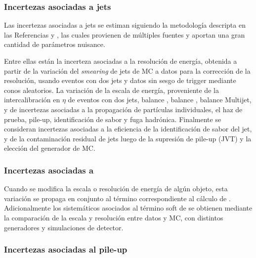 \subsubsection{Incertezas asociadas a jets}

Las incertezas asociadas a jets se estiman siguiendo la metodología descripta en las Referencias \cite{PERF-2011-03} y \cite{ATLAS-CONF-2015-037}, las cuales provienen de múltiples fuentes y aportan una gran cantidad de parámetros nuisance. 


Entre ellas están la incerteza asociadas a la resolución de energía, obtenida a partir de la variación del \textit{smearing} de jets de MC a datos para la corrección de la resolución, usando eventos con dos jets y datos sin sesgo de trigger mediante conos aleatorios.
La variación de la escala de energía, proveniente de la intercalibración en $\eta$ de eventos con dos jets, balance \zj, balance \phj, balance Multijet, y de incertezas asociadas a la propagación de partículas individuales, el haz de prueba, pile-up, identificación de sabor y fuga hadrónica.
Finalmente se consideran incertezas asociadas a la eficiencia de la identificación de sabor del jet, y de la contaminación residual de jets luego de la supresión de pile-up (JVT) y la elección del generador de MC.


\subsubsection{Incertezas asociadas a \met}

Cuando se modifica la escala o resolución de energía de algún objeto, esta variación se propaga en conjunto al término correspondiente al cálculo de \met. Adicionalmente los sistemáticos asociados al término soft de \met se obtienen mediante la comparación de la escala y resolución entre datos y MC, con distintos generadores y simulaciones de detector.

\subsubsection{Incertezas asociadas al pile-up}

